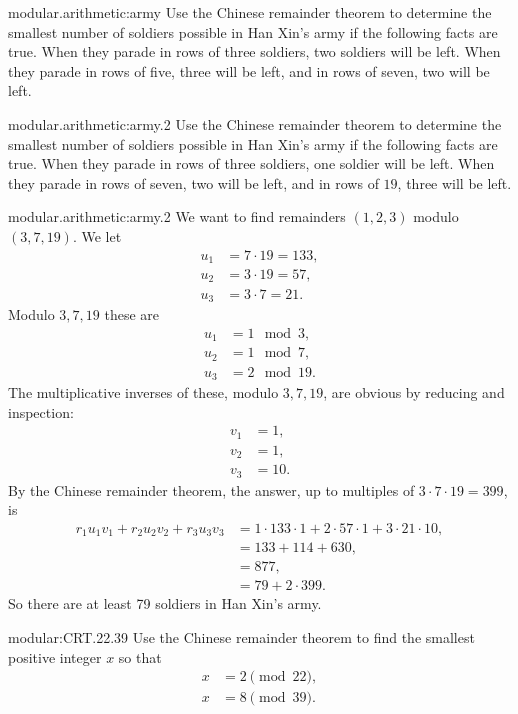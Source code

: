 \begin{problem}{modular.arithmetic:army}
Use the Chinese remainder theorem to determine the smallest number of soldiers possible in Han Xin's army if the following facts are true.
When they parade in rows of three soldiers, two soldiers will be left. When they parade in rows of five, three will be left, and in rows of seven, two will be left.
\end{problem}
\begin{problem}{modular.arithmetic:army.2}
Use the Chinese remainder theorem to determine the smallest number of soldiers possible in Han Xin's army if the following facts are true.
When they parade in rows of three soldiers, one soldier will be left. When they parade in rows of seven, two will be left, and in rows of \(19\), three will be left.
\end{problem}
\begin{answer}{modular.arithmetic:army.2}
We want to find remainders \((1,2,3)\) modulo \((3,7,19)\).
We let 
\begin{align*}
u_1 &= 7 \cdot 19 = 133, \\
u_2 &= 3 \cdot 19 = 57, \\
u_3 &= 3 \cdot 7 = 21.
\end{align*}
Modulo \(3,7,19\) these are
\begin{align*}
u_1 &= 1 \mod{3}, \\
u_2 &= 1 \mod{7}, \\
u_3 &= 2 \mod{19}.
\end{align*}
The multiplicative inverses of these, modulo \(3,7,19\), are obvious by reducing and inspection:
\begin{align*}
v_1 &= 1, \\
v_2 &= 1, \\
v_3 &= 10.
\end{align*}
By the Chinese remainder theorem, the answer, up to multiples of \(3 \cdot 7 \cdot 19=399\), is
\begin{align*}
r_1 u_1 v_1 + r_2 u_2 v_2 + r_3 u_3 v_3 
&=
1 \cdot 133 \cdot 1 
+
2 \cdot 57 \cdot 1
+
3 \cdot 21 \cdot 10,
\\
&=
133+114+630,
\\
&=877,
\\
&=79+2 \cdot 399.
\end{align*}
So there are at least 79 soldiers in Han Xin's army.
\end{answer}
\begin{problem}{modular:CRT.22.39}
Use the Chinese remainder theorem to find the smallest positive integer \(x\) so that
\begin{align*}
x&=2\pmod{22},\\
x&=8\pmod{39}.
\end{align*}
\end{problem}
